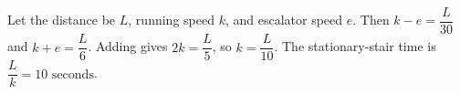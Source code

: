 Let the distance be $L$, running speed $k$, and escalator speed $e$. Then $k-e=\dfrac{L}{30}$ and $k+e=\dfrac{L}{6}$. Adding gives $2k=\dfrac{L}{5}$, so $k=\dfrac{L}{10}$. The stationary-stair time is $\dfrac{L}{k}=\boxed{10\text{ seconds}}$.
